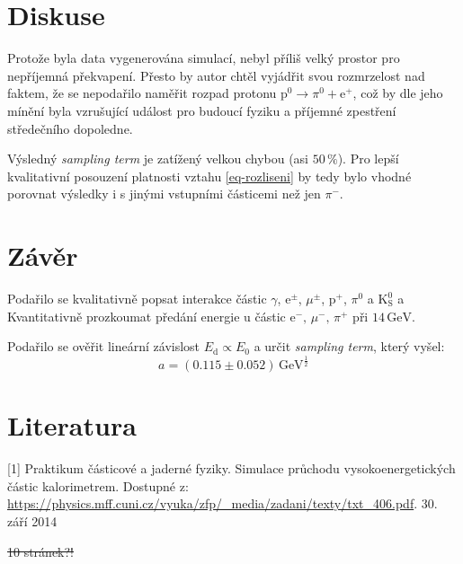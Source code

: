 \documentclass[10pt,a4paper]{article}
\renewcommand{\U}[1]{\ensuremath{\,\mathrm{#1}}}
\newcommand{\°}{\degree}
\renewcommand{\t}[1]{\mathrm{#1}}
\begin{document}
\section{Diskuse}
Protože byla data vygenerována simulací, nebyl příliš velký prostor pro nepříjemná překvapení. Přesto by autor chtěl vyjádřit svou rozmrzelost nad faktem, že se nepodařilo naměřit rozpad protonu $\t p^0 \to \pi^0 + \t e^+$, což by dle jeho mínění byla vzrušující událost pro budoucí fyziku a příjemné zpestření středečního dopoledne.

Výsledný \textit{sampling term} je zatížený velkou chybou (asi  $50 \,\%$). Pro lepší kvalitativní posouzení platnosti vztahu \eqref{eq-rozliseni} by tedy bylo vhodné porovnat výsledky i s jinými vstupními částicemi než jen $\pi^-$.

\section{Závěr}
Podařilo se kvalitativně popsat interakce částic $\gamma$, ${\mathrm e}^\pm$, $\mu^\pm$, ${\mathrm p}^+$, $\pi^0$ a ${\mathrm K}_{\mathrm S}^0$ a Kvantitativně prozkoumat předání energie u částic $\t e^- \!,\, \mu^- \!,\, \pi^+$ při $14 \U{GeV}$.

Podařilo se ověřit lineární závislost $E_{\mathrm d} \propto E_0$ a určit \textit{sampling term}, který vyšel:
\begin{equation*}
    a = (0.115 \pm 0.052) \U{GeV^{\frac{1}{2}}}
\end{equation*}


\section{Literatura}
[1] Praktikum částicové a jaderné fyziky. Simulace průchodu vysokoenergetických částic kalorimetrem. Dostupné z: \url{https://physics.mff.cuni.cz/vyuka/zfp/_media/zadani/texty/txt_406.pdf}. 30. září 2014

\vspace{12\baselineskip}

\centering
\st{10 stránek?!}
\end{document}
